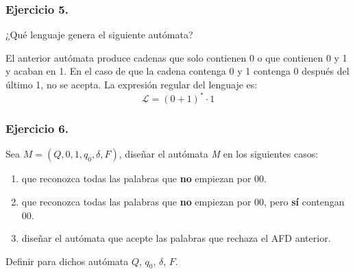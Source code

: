 \documentclass[11pt,a4paper]{article}
\begin{document}
\subsubsection{Ejercicio 5.} ¿Qué lenguaje genera el siguiente autómata?

\begin{figure}[H]
\centering
{}
\end{figure}

El anterior autómata produce cadenas que solo contienen 0 o que contienen 0 y 1 y acaban en 1. En el caso de que la cadena contenga 0 y 1 contenga 0 después del último 1, no se acepta. La expresión regular del lenguaje es:
	\[\mathcal{L}=(0+1)^{*}\cdot 1\]

\subsubsection{Ejercicio 6.} Sea $M = (Q, {0,1},q_0,\delta,F)$, diseñar el autómata \textit{M} en los siguientes casos:
	\begin{enumerate}
	\item que reconozca todas las palabras que \textbf{no} empiezan por 00.
	\item que reconozca todas las palabras que \textbf{no} empiezan por 00, pero \textbf{sí} contengan 00.
	\item diseñar el autómata que acepte las palabras que rechaza el AFD anterior.
	\end{enumerate}	
	
Definir para dichos autómata $Q$, $q_0$, $\delta$, $F$.\\
\end{document}
